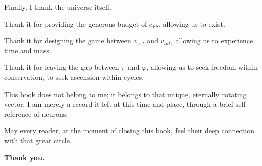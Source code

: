 Finally, I thank the universe itself.

Thank it for providing the generous budget of $c_{FS}$, allowing us to exist.

Thank it for designing the game between $v_{ext}$ and $v_{int}$, allowing us to experience time and mass.

Thank it for leaving the gap between $\pi$ and $\varphi$, allowing us to seek freedom within conservation, to seek ascension within cycles.

This book does not belong to me; it belongs to that unique, eternally rotating vector. I am merely a record it left at this time and place, through a brief self-reference of neurons.

May every reader, at the moment of closing this book, feel their deep connection with that great circle.

\textbf{Thank you.}

